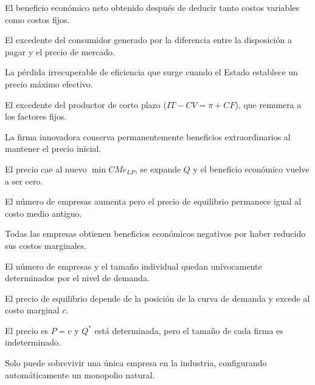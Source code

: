 \begin{opts}
    \item El beneficio económico neto obtenido después de deducir tanto costos variables como costos fijos.
    \item El excedente del consumidor generado por la diferencia entre la disposición a pagar y el precio de mercado.
    \item La pérdida irrecuperable de eficiencia que surge cuando el Estado establece un precio máximo efectivo.
    \item El excedente del productor de corto plazo ($IT - CV = \pi + CF$), que remunera a los factores fijos.
\end{opts}

\begin{opts}
    \item La firma innovadora conserva permanentemente beneficios extraordinarios al mantener el precio inicial.
    \item El precio cae al nuevo $\min CMe_{LP}$, se expande $Q$ y el beneficio económico vuelve a ser cero.
    \item El número de empresas aumenta pero el precio de equilibrio permanece igual al costo medio antiguo.
    \item Todas las empresas obtienen beneficios económicos negativos por haber reducido sus costos marginales.
\end{opts}

\begin{opts}
    \item El número de empresas y el tamaño individual quedan unívocamente determinados por el nivel de demanda.
    \item El precio de equilibrio depende de la posición de la curva de demanda y excede al costo marginal $c$.
    \item El precio es $P = c$ y $Q^*$ está determinada, pero el tamaño de cada firma es indeterminado.
    \item Solo puede sobrevivir una única empresa en la industria, configurando automáticamente un monopolio natural.
\end{opts}

